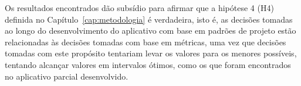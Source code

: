 Os resultados encontrados dão subsídio para afirmar que a hipótese 4 (H4) definida no Capítulo~\ref{cap:metodologia} é verdadeira, isto é, as decisões tomadas ao longo do desenvolvimento do aplicativo com base em padrões de projeto estão relacionadas às decisões tomadas com base em métricas, uma vez que decisões tomadas com este propósito tentariam levar os valores para os menores possíveis, tentando alcançar valores em intervalos ótimos, como os que foram encontrados no aplicativo parcial desenvolvido.
